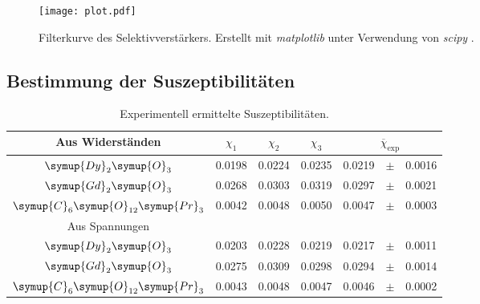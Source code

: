 \begin{figure}
  \centering
  \texttt{[image: plot.pdf]}
  \caption{Filterkurve des Selektivverstärkers. Erstellt mit \textit{matplotlib} \cite{matplotlib} unter Verwendung von \textit{scipy} \cite{scipy}.}
  \label{fig:plot}
\end{figure}

\subsection{Bestimmung der Suszeptibilitäten}
\label{subsec:A_Suszep}

\begin{table}
  \centering
  \caption{Experimentell ermittelte Suszeptibilitäten.}
  \label{tab:Chi_exp}
  \begin{tabular}{c S[table-format = 1.4] S S r c l}
    \toprule
      {Aus Widerständen} & {$\chi_1$} & {$\chi_2$} & {$\chi_3$} &
        \\
    \midrule
      {$\symup{Dy}_2\symup{O}_3$}                 & 0.0198 & 0.0224 & 0.0235 & 0.0219 & {$\pm$} & 0.0016 \\
      {$\symup{Gd}_2\symup{O}_3$}                 & 0.0268 & 0.0303 & 0.0319 & 0.0297 & {$\pm$} & 0.0021 \\
      {$\symup{C}_6\symup{O}_{12}\symup{Pr}_3$}   & 0.0042 & 0.0048 & 0.0050 & 0.0047 & {$\pm$} & 0.0003 \\
    \bottomrule
      {Aus Spannungen} & & & & & \\
    \bottomrule 
      {$\symup{Dy}_2\symup{O}_3$}                 & 0.0203 & 0.0228 & 0.0219 & 0.0217 & {$\pm$} & 0.0011 \\
      {$\symup{Gd}_2\symup{O}_3$}                 & 0.0275 & 0.0309 & 0.0298 & 0.0294 & {$\pm$} & 0.0014 \\
      {$\symup{C}_6\symup{O}_{12}\symup{Pr}_3$}   & 0.0043 & 0.0048 & 0.0047 & 0.0046 & {$\pm$} & 0.0002 \\
    \bottomrule 
  \end{tabular}
\end{table}
